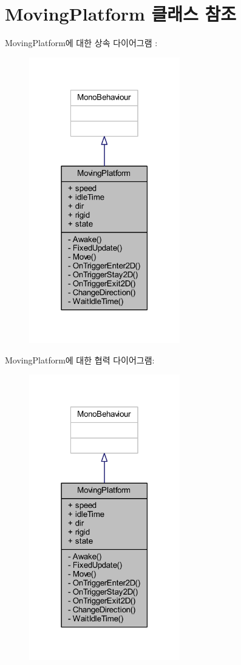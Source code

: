 \hypertarget{class_moving_platform}{}\section{Moving\+Platform 클래스 참조}
\label{class_moving_platform}


Moving\+Platform에 대한 상속 다이어그램 \+: \nopagebreak
\begin{figure}[H]
\begin{center}
\leavevmode
\includegraphics[width=186pt]{d8/ddd/class_moving_platform__inherit__graph}
\end{center}
\end{figure}


Moving\+Platform에 대한 협력 다이어그램\+:\nopagebreak
\begin{figure}[H]
\begin{center}
\leavevmode
\includegraphics[width=186pt]{df/d56/class_moving_platform__coll__graph}
\end{center}
\end{figure}
